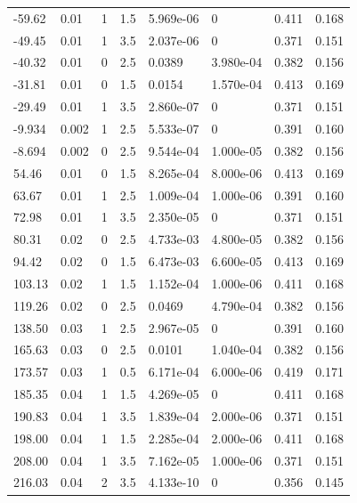 \documentclass[preview]{standalone}
\begin{document}
{{\begin{tabular}{L{1.2cm}C{1.2cm} C{0.3cm}C{0.5cm} C{1.4cm}C{1.4cm} C{1.4cm}C{1.4cm}}
  -59.62  &  0.01  & 1     & 1.5 &  5.969e-06  & 0  & 0.411 &  0.168   \\ 
  -49.45  &  0.01  & 1     & 3.5 &  2.037e-06  & 0  & 0.371 &  0.151   \\ 
  -40.32  &  0.01  & 0     & 2.5 &  0.0389  & 3.980e-04  & 0.382 &  0.156   \\ 
  -31.81  &  0.01  & 0     & 1.5 &  0.0154  & 1.570e-04  & 0.413 &  0.169   \\ 
  -29.49  &  0.01  & 1     & 3.5 &  2.860e-07  & 0  & 0.371 &  0.151   \\ 
  -9.934  &  0.002  & 1     & 2.5 &  5.533e-07  & 0  & 0.391 &  0.160   \\ 
  -8.694  &  0.002  & 0     & 2.5 &  9.544e-04  & 1.000e-05  & 0.382 &  0.156   \\ 
  54.46  &  0.01  & 0     & 1.5 &  8.265e-04  & 8.000e-06  & 0.413 &  0.169   \\ 
  63.67  &  0.01  & 1     & 2.5 &  1.009e-04  & 1.000e-06  & 0.391 &  0.160   \\ 
  72.98  &  0.01  & 1     & 3.5 &  2.350e-05  & 0  & 0.371 &  0.151   \\ 
  80.31  &  0.02  & 0     & 2.5 &  4.733e-03  & 4.800e-05  & 0.382 &  0.156   \\ 
  94.42  &  0.02  & 0     & 1.5 &  6.473e-03  & 6.600e-05  & 0.413 &  0.169   \\ 
  103.13  &  0.02  & 1     & 1.5 &  1.152e-04  & 1.000e-06  & 0.411 &  0.168   \\ 
  119.26  &  0.02  & 0     & 2.5 &  0.0469  & 4.790e-04  & 0.382 &  0.156   \\ 
  138.50  &  0.03  & 1     & 2.5 &  2.967e-05  & 0  & 0.391 &  0.160   \\ 
  165.63  &  0.03  & 0     & 2.5 &  0.0101  & 1.040e-04  & 0.382 &  0.156   \\ 
  173.57  &  0.03  & 1     & 0.5 &  6.171e-04  & 6.000e-06  & 0.419 &  0.171   \\ 
  185.35  &  0.04  & 1     & 1.5 &  4.269e-05  & 0  & 0.411 &  0.168   \\ 
  190.83  &  0.04  & 1     & 3.5 &  1.839e-04  & 2.000e-06  & 0.371 &  0.151   \\ 
  198.00  &  0.04  & 1     & 1.5 &  2.285e-04  & 2.000e-06  & 0.411 &  0.168   \\ 
  208.00  &  0.04  & 1     & 3.5 &  7.162e-05  & 1.000e-06  & 0.371 &  0.151   \\ 
  216.03  &  0.04  & 2     & 3.5 &  4.133e-10  & 0  & 0.356 &  0.145   \\ 

\end{tabular}}}
\end{document}
